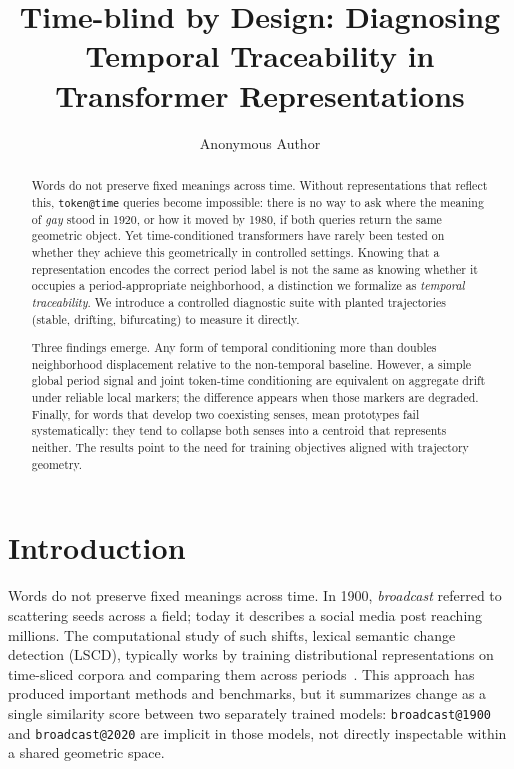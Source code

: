 \documentclass[runningheads]{llncs}
\begin{document}
\title{Time-blind by Design: Diagnosing Temporal Traceability in Transformer Representations}

\author{Anonymous Author}


\maketitle

\begin{abstract}
Words do not preserve fixed meanings across time. Without representations that 
reflect this, \texttt{token@time} queries become impossible: there is no way to ask where 
the meaning of \emph{gay} stood in 1920, or how it moved by 1980, if both 
queries return the same geometric object. Yet time-conditioned transformers have 
rarely been tested on whether they achieve this geometrically in controlled settings. Knowing 
that a representation encodes the correct period label is not the same as knowing 
whether it occupies a period-appropriate neighborhood, a distinction we formalize 
as \emph{temporal traceability}. We introduce a controlled diagnostic suite 
with planted trajectories (stable, drifting, bifurcating) to measure it directly.

Three findings emerge. Any form of temporal conditioning more than doubles 
neighborhood displacement relative to the non-temporal baseline. However, a 
simple global period signal and joint token-time conditioning are equivalent on 
aggregate drift under reliable local markers; the difference appears when those 
markers are degraded. Finally, for words that develop two coexisting senses, mean 
prototypes fail systematically: they tend to collapse both senses into a centroid that 
represents neither. The results point to the need for training objectives aligned 
with trajectory geometry.

\end{abstract}

\section{Introduction}

Words do not preserve fixed meanings across time. In 1900, \emph{broadcast} referred to scattering seeds across a field; today it describes a social media post reaching millions. The computational study of such shifts, lexical semantic change detection (LSCD), typically works by training distributional representations on time-sliced corpora and comparing them across periods~\cite{schlechtweg2020semeval,tahmasebi2021survey}. This approach has produced important methods and benchmarks, but it summarizes change as a single similarity score between two separately trained models: \texttt{broadcast@1900} and \texttt{broadcast@2020} are implicit in those models, not directly inspectable within a shared geometric space.
\end{document}
